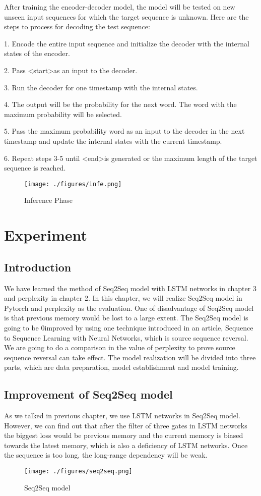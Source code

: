After training the encoder-decoder model, the model will be tested on new unseen input sequences for which the target sequence is unknown. Here are the steps to process for decoding the test sequence:

1. Encode the entire input sequence and initialize the decoder with the internal states of the encoder.

2. Pass \textless start\textgreater as an input to the decoder.

3. Run the decoder for one timestamp with the internal states.

4. The output will be the probability for the next word. The word with the maximum probability will be selected.

5. Pass the maximum probability word as an input to the decoder in the next timestamp and update the internal states with the current timestamp.

6. Repeat steps 3-5 until \textless end\textgreater is generated or the maximum length of the target sequence is reached.
\begin{figure}[h]
	\centering
	\texttt{[image: ./figures/infe.png]}
	
	\caption{Inference Phase}
\end{figure}



\chapter{Experiment}
\section*{Introduction}
We have learned the method of Seq2Seq model with LSTM networks in chapter 3 and perplexity in chapter 2. In this chapter, we will realize Seq2Seq model in Pytorch and perplexity as the evaluation. One of disadvantage of Seq2Seq model is that previous memory would be lost to a large extent. The Seq2Seq model is going to be 0improved by using one technique introduced in an article, Sequence to Sequence Learning with Neural Networks, which is source sequence reversal. We are going to do a comparison in the value of perplexity to prove source sequence reversal can take effect. The model realization will be divided into three parts, which are data preparation, model establishment and model training.
\minitoc
\section{Improvement of Seq2Seq model}
As we talked in previous chapter, we use LSTM networks in Seq2Seq model. However, we can find out that after the filter of three gates in LSTM networks the biggest loss would be previous memory and the current memory is biased towards the latest memory, which is also a deficiency of LSTM networks. Once the sequence is too long, the long-range dependency will be weak.
\begin{figure}[h]
	\centering
	\texttt{[image: ./figures/seq2seq.png]}
	
	\caption{Seq2Seq model}
\end{figure}


